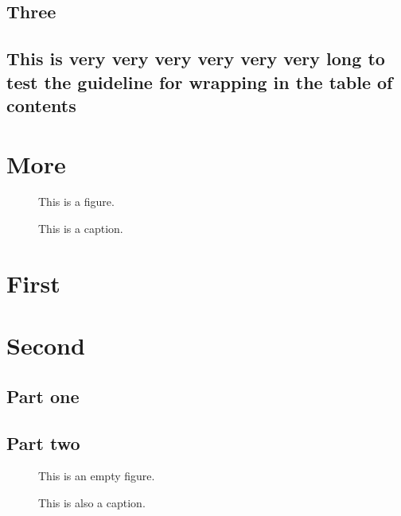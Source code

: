 \documentclass{utthesis}
\begin{document}
\section{Three}
\section{This is very very very very very very long to test the guideline for wrapping in the table of contents}

\chapter{More}
\lipsum[3]
\begin{figure}
This is a figure.
\caption[This]{This is a caption.}
\end{figure}



\begin{appendix}

\chapter{First}
\lipsum[3]

\chapter{Second}
\section{Part one}
\lipsum[3]
\section{Part two}
\begin{figure}
This is an empty figure.
\caption[That]{This is also a caption.}
\end{figure}

\end{appendix}

\backmatter

\printindex

\cleardoublepage
{}

\printbibliography
\end{document}

